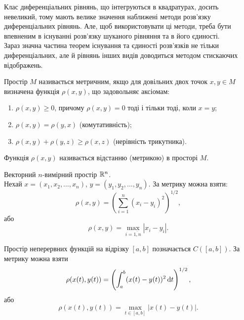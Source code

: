 Клас диференціальних рівнянь, що інтегруються в квадратурах, досить невеликий, тому мають велике значення наближені методи розв’язку диференціальних рівнянь. Але, щоб використовувати ці методи, треба бути впевненим в існуванні розв’язку шуканого рівняння та в його єдиності. \\

Зараз значна частина теорем існування  та єдиності розв’язків не тільки диференціальних, але й рівнянь інших видів доводиться методом стискаючих відображень. \\

\begin{definition} 
	Простір $M$ називається метричним, якщо для довільних двох точок $x,y\in M$ визначена функція $\rho(x,y)$, що задовольняє аксіомам:
	\begin{enumerate}
		\item $\rho(x, y)\ge0$, причому $\rho(x,y)=0$ тоді і тільки тоді, коли $x=y$;
		\item $\rho(x,y)=\rho(y,x)$ (комутативність);
		\item $\rho(x,y)+\rho(y,z)\ge\rho(x,z)$ (нерівність трикутника).
	\end{enumerate}
	Функція $\rho(x,y)$ називається відстанню (метрикою) в просторі $M$.
\end{definition}
\begin{example*} 
	Векторний $n$-вимірний простір $\mathbb{R}^n$. \\

	Нехай $x=(x_1,x_2,\ldots,x_n)$, $y=(y_1,y_2,\ldots,y_n)$. За метрику можна взяти: 
	\begin{equation*}
		\rho(x,y)=\left(\sum_{i=1}^n (x_i-y_i)^2\right)^{1/2},
	\end{equation*}
	або 
	\begin{equation*}
		\rho(x,y)=\max_{i=\overline{1,n}}|x_i-y_i|.
	\end{equation*}
\end{example*}
\begin{example*} 
	Простір неперервних функцій на відрізку $[a,b]$ позначається $C([a,b])$. За метрику можна взяти
		\begin{equation*}
		\rho(x(t), y(t)) = \left(\int_a^b (x(t)-y(t))^2 \mathop{}\!\mathrm{d} t\right)^{1/2},
	\end{equation*}
	або
	\begin{equation*}
		\rho(x(t), y(t)) = \max_{t\in[a,b]} |x(t)-y(t)|.
	\end{equation*}
\end{example*}
